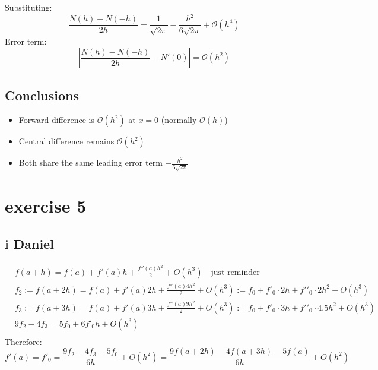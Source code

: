 \documentclass{article}
\begin{document}
Substituting:
\[
\frac{N(h)-N(-h)}{2h} = \frac{1}{\sqrt{2\pi}} - \frac{h^2}{6\sqrt{2\pi}} + \mathcal{O}(h^4)
\]
Error term:
\[
\left|\frac{N(h)-N(-h)}{2h}-N'(0)\right| = \mathcal{O}(h^2)
\]

\subsection*{Conclusions}
\begin{itemize}
\item Forward difference is $\mathcal{O}(h^2)$ at $x=0$ (normally $\mathcal{O}(h)$)
\item Central difference remains $\mathcal{O}(h^2)$
\item Both share the same leading error term $-\frac{h^2}{6\sqrt{2\pi}}$
\end{itemize}


\section{exercise 5}
\subsection{i Daniel}
\begin{align}
     & f\left( a+h \right) = f\left( a \right)+f'\left( a \right)h+\frac{f''\left( a \right){{h}^{2}}}{2}+O\left( {{h}^{3}} \right)\quad \text{just reminder}                                                                           \\
     & {{f}_{2}}:=f\left( a+2h \right) = f\left( a \right)+f'\left( a \right)2h+\frac{f''\left( a \right)4{{h}^{2}}}{2}+O\left( {{h}^{3}} \right):={{f}_{0}}+f{{'}_{0}}\cdot 2h+f'{{'}_{0}}\cdot 2{{h}^{2}}+O\left( {{h}^{3}} \right)   \\
     & {{f}_{3}}:=f\left( a+3h \right) = f\left( a \right)+f'\left( a \right)3h+\frac{f''\left( a \right)9{{h}^{2}}}{2}+O\left( {{h}^{3}} \right):={{f}_{0}}+f{{'}_{0}}\cdot 3h+f'{{'}_{0}}\cdot 4.5{{h}^{2}}+O\left( {{h}^{3}} \right) \\
     & 9{{f}_{2}}-4{{f}_{3}}=5{{f}_{0}}+6f{{'}_{0}}h+O\left( {{h}^{3}} \right)                                                                                                                                                          \\
\end{align}
Therefore:
\[f'\left( a \right)=f{{'}_{0}}=\frac{9{{f}_{2}}-4{{f}_{3}}-5{{f}_{0}}}{6h}+O\left( {{h}^{2}} \right)=\frac{9f\left( a+2h \right)-4f\left( a+3h \right)-5f\left( a \right)}{6h}+O\left( {{h}^{2}} \right)\]
\end{document}
